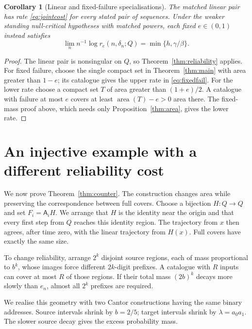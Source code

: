 \documentclass[11pt]{amsart}
\newtheorem{corollary}[theorem]{Corollary}
\theoremstyle{definition}
\theoremstyle{remark}
\newcommand{\area}{\operatorname{area}}
\numberwithin{equation}{section}
\begin{document}
\begin{corollary}[Linear and fixed-failure specialisations]\label{cor:failure}
The matched linear pair has rate \eqref{eq:jointcost} for every
stated pair of sequences. Under the weaker standing null-critical
hypotheses with matched powers, each fixed $e\in(0,1)$ instead satisfies
\begin{equation}\label{eq:fixedfail}
\lim_n n^{-1}\log r_e(n,\delta_n;Q)=\min\{h,\gamma/\beta\}.
\end{equation}
\end{corollary}
\begin{proof}
The linear pair is nonsingular on $Q$, so
Theorem~\ref{thm:reliability} applies.
For fixed failure, choose the single compact set in
Theorem~\ref{thm:main} with area greater than $1-e$; its catalogue
gives the upper rate in \eqref{eq:fixedfail}.
For the lower rate choose a compact set $T$ of area greater
than $(1+e)/2$. A catalogue with failure at most $e$ covers at
least $\area(T)-e>0$ area there. The fixed-mass proof above,
which needs only Proposition~\ref{thm:area}, gives the lower rate.
\end{proof}

\section{An injective example with a different reliability cost}
\label{sec:counter}
We now prove Theorem~\ref{thm:counter}. The construction changes
area while preserving the correspondence between full covers.
Choose a bijection $H:Q\to Q$ and set $F_i=\mathsf A_iH$.
We arrange that $H$ is the identity near the origin and that every
first step from $Q$ reaches this identity region. The trajectory
from $x$ then agrees, after time zero, with the linear trajectory
from $H(x)$. Full covers have exactly the same size.

To change reliability, arrange $2^k$ disjoint source regions,
each of mass proportional to $b^k$, whose images force different
$2k$-digit prefixes. A catalogue with $R$ inputs can cover at
most $R$ of those regions. If their total mass $(2b)^k$ decays
more slowly than $e_n$, almost all $2^k$ prefixes are required.

We realise this geometry with two Cantor constructions having
the same binary addresses. Source intervals shrink by $b=2/5$;
target intervals shrink by $\lambda=a_0a_1$. The slower source
decay gives the excess probability mass.
\end{document}
